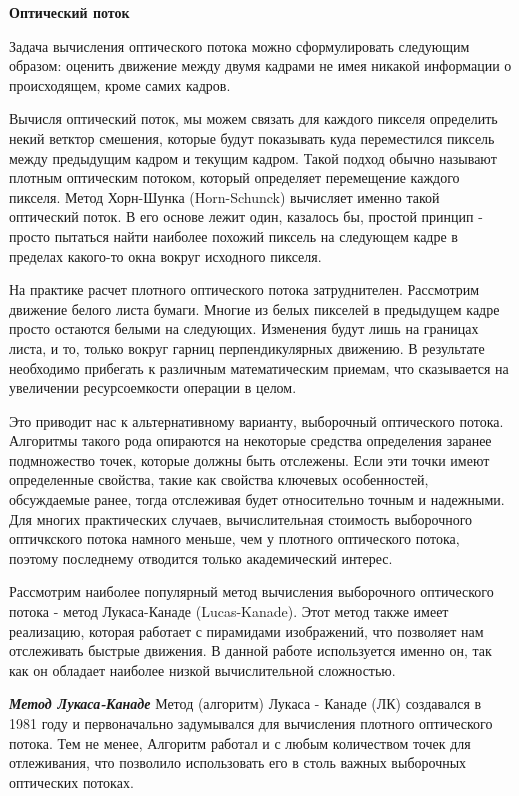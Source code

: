 \textbf{Оптический поток}

Задача вычисления оптического потока можно сформулировать следующим образом: оценить движение между двумя кадрами не имея никакой информации о происходящем, кроме самих кадров\cite{OpenCVBook}. 

Вычисля оптический поток, мы можем связать для каждого пикселя определить некий ветктор смешения, которые будут показывать куда переместился пиксель между предыдущим кадром и текущим кадром. Такой  подход обычно называют плотным оптическим потоком, который определяет перемещение каждого пикселя. Метод Хорн-Шунка (Horn-Schunck) вычисляет именно такой оптический поток. В его основе лежит один, казалось бы, простой принцип - просто пытаться найти наиболее похожий пиксель на следующем кадре в пределах какого-то окна вокруг исходного пикселя.

На практике расчет плотного оптического потока затруднителен. Рассмотрим движение белого листа бумаги. Многие из белых пикселей в предыдущем кадре просто остаются белыми на следующих. Изменения будут лишь на границах листа, и то, только вокруг гарниц перпендикулярных движению. В результате необходимо прибегать к различным математическим приемам, что сказывается на увеличении ресурсоемкости операции в целом. 

Это приводит нас к альтернативному варианту, выборочный оптического потока. Алгоритмы такого рода опираются на некоторые средства определения заранее подмножество точек, которые должны быть отслежены. Если эти точки имеют определенные свойства, такие как свойства ключевых особенностей, обсуждаемые ранее, тогда отслеживая будет относительно точным и надежными. Для многих практических случаев, вычислительная стоимость выборочного оптичкского потока намного меньше, чем у плотного оптического потока, поэтому последнему отводится только академический интерес.

Рассмотрим наиболее популярный метод вычисления выборочного оптического потока - метод Лукаса-Канаде (Lucas-Kanade). Этот метод также имеет реализацию, которая работает с пирамидами изображений, что позволяет нам отслеживать быстрые движения. В данной работе используется именно он, так как он обладает наиболее низкой вычислительной сложностью. 

{\large \textit{\textbf{Метод Лукаса-Канаде}}}
\label{label:lucas-kanade-math}
Метод (алгоритм) Лукаса - Канаде (ЛК) создавался в 1981 году и первоначально задумывался для вычисления плотного оптического потока. Тем не менее, Алгоритм работал и с любым количеством точек для отлеживания, что позволило использовать его в столь важных выборочных оптических потоках. 

